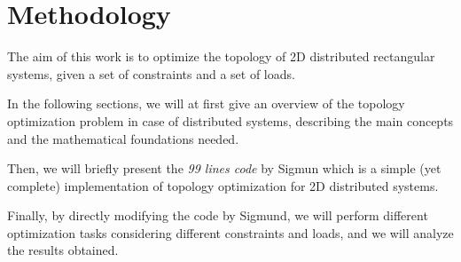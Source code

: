 \section{Methodology}
\label{sec:methodology}

The aim of this work is to optimize the topology of 2D distributed rectangular systems, given a set of constraints and a set of loads.

In the following sections, we will at first give an overview of the topology optimization problem in case of distributed systems, describing the main concepts and the mathematical foundations needed.

Then, we will briefly present the \textit{99 lines code} by Sigmun \cite{Sigmund2001} which is a simple (yet complete) implementation of topology optimization for 2D distributed systems.

Finally, by directly modifying the code by Sigmund, we will perform different optimization tasks considering different constraints and loads, and we will analyze the results obtained.